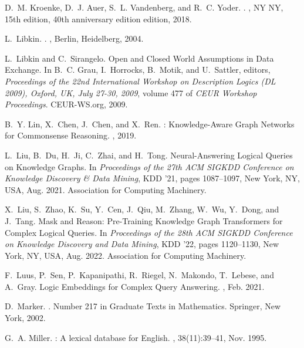 \documentclass[11pt]{article}
\begin{document}
\begin{thebibliography}{10}
\begin{small}
D.~M. Kroenke, D.~J. Auer, S.~L. Vandenberg, and R.~C. Yoder.
.
, {NY NY}, 15th edition, 40th anniversary edition edition,
2018.

L.~Libkin.
.
, {Berlin, Heidelberg}, 2004.

L.~Libkin and C.~Sirangelo.
\newblock Open and {{Closed World Assumptions}} in {{Data Exchange}}.
\newblock In B.~C. Grau, I.~Horrocks, B.~Motik, and U.~Sattler, editors, {\em
	Proceedings of the 22nd {{International Workshop}} on {{Description Logics}}
	({{DL}} 2009), {{Oxford}}, {{UK}}, {{July}} 27-30, 2009}, volume 477 of {\em
	{{CEUR Workshop Proceedings}}}. {CEUR-WS.org}, 2009.

B.~Y. Lin, X.~Chen, J.~Chen, and X.~Ren.
: {{Knowledge-Aware Graph Networks}} for {{Commonsense
		Reasoning}}.
, 2019.

L.~Liu, B.~Du, H.~Ji, C.~Zhai, and H.~Tong.
\newblock Neural-{{Answering Logical Queries}} on {{Knowledge Graphs}}.
\newblock In {\em Proceedings of the 27th {{ACM SIGKDD Conference}} on
	{{Knowledge Discovery}} \& {{Data Mining}}}, {{KDD}} '21, pages 1087--1097,
{New York, NY, USA}, Aug. 2021. {Association for Computing Machinery}.

X.~Liu, S.~Zhao, K.~Su, Y.~Cen, J.~Qiu, M.~Zhang, W.~Wu, Y.~Dong, and J.~Tang.
\newblock Mask and {{Reason}}: {{Pre-Training Knowledge Graph Transformers}}
for {{Complex Logical Queries}}.
\newblock In {\em Proceedings of the 28th {{ACM SIGKDD Conference}} on
	{{Knowledge Discovery}} and {{Data Mining}}}, {{KDD}} '22, pages 1120--1130,
{New York, NY, USA}, Aug. 2022. {Association for Computing Machinery}.

F.~Luus, P.~Sen, P.~Kapanipathi, R.~Riegel, N.~Makondo, T.~Lebese, and A.~Gray.
\newblock Logic {{Embeddings}} for {{Complex Query Answering}}.
, Feb. 2021.

D.~Marker.
.
\newblock Number 217 in Graduate Texts in Mathematics. {Springer}, {New York},
2002.

G.~A. Miller.
: A lexical database for {{English}}.
, 38(11):39--41, Nov. 1995.


\end{small}
\end{thebibliography}
\end{document}
